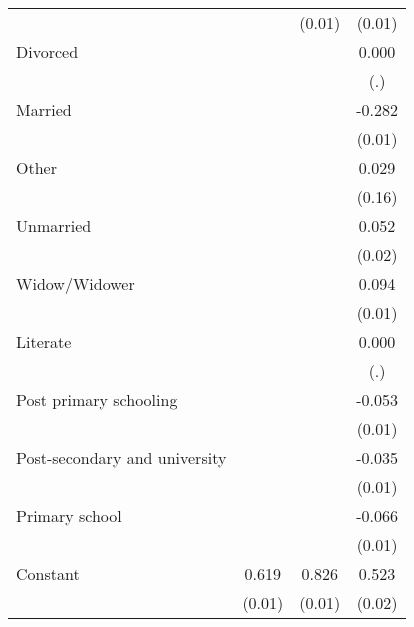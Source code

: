 {\begin{tabular}{l*{3}{c}}
                    &                     &      (0.01)         &      (0.01)         \\
Divorced            &                     &                     &       0.000         \\
                    &                     &                     &         (.)         \\
Married             &                     &                     &      -0.282\sym{***}\\
                    &                     &                     &      (0.01)         \\
Other               &                     &                     &       0.029         \\
                    &                     &                     &      (0.16)         \\
Unmarried           &                     &                     &       0.052\sym{**} \\
                    &                     &                     &      (0.02)         \\
Widow/Widower       &                     &                     &       0.094\sym{***}\\
                    &                     &                     &      (0.01)         \\
Literate            &                     &                     &       0.000         \\
                    &                     &                     &         (.)         \\
Post primary schooling&                     &                     &      -0.053\sym{***}\\
                    &                     &                     &      (0.01)         \\
Post-secondary and university&                     &                     &      -0.035\sym{**} \\
                    &                     &                     &      (0.01)         \\
Primary school      &                     &                     &      -0.066\sym{***}\\
                    &                     &                     &      (0.01)         \\
Constant            &       0.619\sym{***}&       0.826\sym{***}&       0.523\sym{***}\\
                    &      (0.01)         &      (0.01)         &      (0.02)         \\

\end{tabular}}
